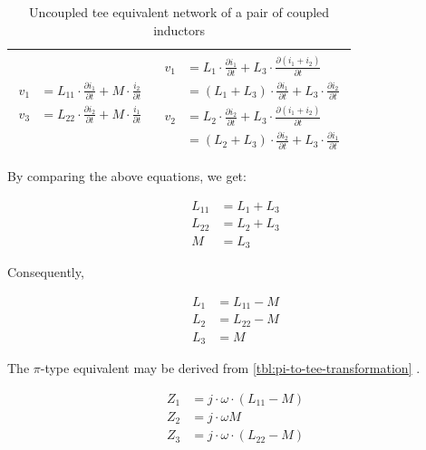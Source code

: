 \begin{table}[H]
\begin{tabular}{ | c | c | }
\\ \hline
    \begin{minipage}{.4\textwidth}
         {\begin{align}
           v_1 &= L_{11} \cdot  \frac{\partial i_1}{\partial t}  + M \cdot \frac{i_2}{\partial t}\\
           v_3 &= L_{22} \cdot  \frac{\partial i_2}{\partial t}  + M \cdot \frac{i_1}{\partial t}
         \end{align}}
    \end{minipage}
    &
        \begin{minipage}{.4\textwidth}
         {\begin{align}
           v_1 &= L_1 \cdot \frac{\partial i_1}{\partial t} + L_3 \cdot \frac{\partial (i_1 + i_2)}{\partial t} \\
               &= (L_1 + L_3) \cdot \frac{\partial i_1}{\partial t} + L_3 \cdot \frac{\partial i_2}{\partial t} \\
           v_2 &= L_2 \cdot \frac{\partial i_2}{\partial t} + L_3 \cdot \frac{\partial (i_1 + i_2)}{\partial t} \\
               &= (L_2 + L_3) \cdot \frac{\partial i_2}{\partial t} + L_3 \cdot \frac{\partial i_1}{\partial t}
         \end{align}}
    \end{minipage}
    \\ \hline
  \end{tabular}
  \caption{Uncoupled tee equivalent network of a pair of coupled inductors}
  \label{tbl:tee-coupled-inductors}
\end{table}

\noindent By comparing the above equations, we get:

\begin{align}
   L_{11} &= L_1 + L_3 \\
   L_{22} &= L_2 + L_3 \\
   M &= L_3
\end{align}

\noindent Consequently,

\begin{align}
   L_1 &= L_{11} - M \\
   L_2 &= L_{22} - M \\
   L_3 &= M
\end{align}

\noindent The $\pi$-type equivalent may be derived from \ref{tbl:pi-to-tee-transformation} .

\begin{align}
   Z_1 &= j \cdot \omega \cdot (L_{11} - M) \\
   Z_2 &= j \cdot \omega M \\
   Z_3 &= j \cdot \omega \cdot (L_{22} - M)
\end{align}


